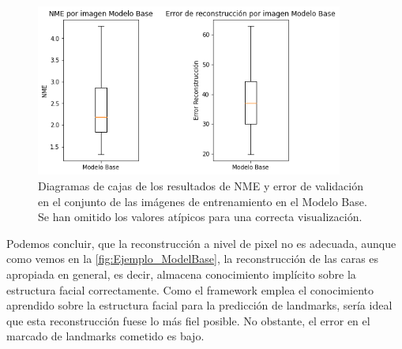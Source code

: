         \begin{figure}[H]
            \centering
            \includegraphics[width=0.9\textwidth]{img/boxplot_modelo_base.png}
            \caption{Diagramas de cajas de los resultados de NME y error de validación en el conjunto de las imágenes de entrenamiento en el Modelo Base. Se han omitido los valores atípicos para una correcta visualización.}
            \label{fig:boxplot_ModeloBase_NME}
        \end{figure}

        \noindent Podemos concluir, que la reconstrucción a nivel de pixel no es adecuada, aunque como vemos en la \autoref{fig:Ejemplo_ModelBase}, la reconstrucción de las caras es apropiada en general, es decir, almacena conocimiento implícito sobre la estructura facial correctamente. Como el framework emplea el conocimiento aprendido sobre la estructura facial para la predicción de landmarks, sería ideal que esta reconstrucción fuese lo más fiel posible. No obstante, el error en el marcado de landmarks cometido es bajo.

